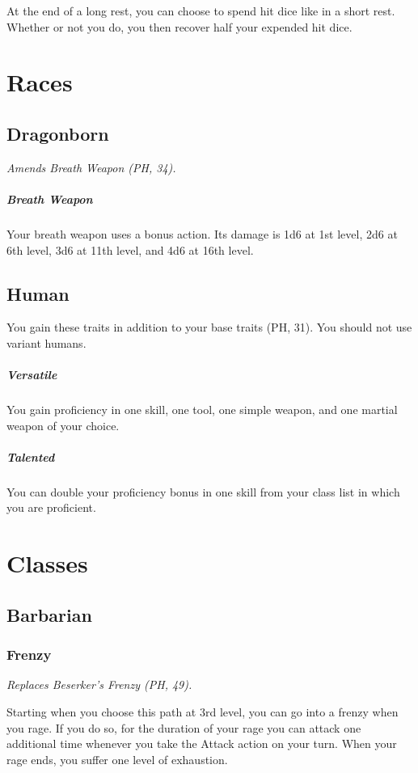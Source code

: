 \documentclass[House_Rules.tex]{subfiles}
\begin{document}
At the end of a long rest, you can choose to spend hit dice like in a short rest. Whether or not you do, you then recover half your expended hit dice.




\section{Races}

\subsection{Dragonborn}
\textit{Amends Breath Weapon (PH, 34).}

\subparagraph{Breath Weapon} Your breath weapon uses a bonus action. Its damage is 1d6 at 1st level, 2d6 at 6th level, 3d6 at 11th level, and 4d6 at 16th level.

\subsection{Human}

You gain these traits in addition to your base traits (PH, 31). You should not use variant humans.

\subparagraph{Versatile} You gain proficiency in one skill, one tool, one simple weapon, and one martial weapon of your choice.
\subparagraph{Talented} You can double your proficiency bonus in one skill from your class list in which you are proficient.




\section{Classes}

\subsection{Barbarian}

\subsubsection{Frenzy}
\textit{Replaces Beserker's Frenzy (PH, 49).}

Starting when you choose this path at 3rd level, you can go into a frenzy when you rage. If you do so, for the duration of your rage you can attack one additional time whenever you take the Attack action on your turn. When your rage ends, you suffer one level of exhaustion.
\end{document}
